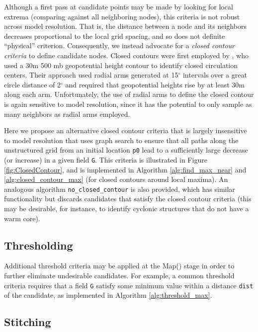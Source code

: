 \documentclass[gmdd, hvmath, online]{copernicus_discussions}
\begin{document}
Although a first pass at candidate points may be made by looking for local extrema (comparing against all neighboring nodes), this criteria is not robust across model resolution.  That is, the distance between a node and its neighbors decreases proportional to the local grid spacing, and so does not definite ``physical'' criterion.  Consequently, we instead advocate for a \textit{closed contour criteria} to define candidate nodes.  Closed contours were first employed by \cite{bell198915}, who used a 30m 500 mb geopotential height contour to identify closed circulation centers.  Their approach used radial arms generated at 15$^\circ$ intervals over a great circle distance of 2$^\circ$ and required that geopotential heights rise by at least 30m along each arm.  Unfortunately, the use of radial arms to define the closed contour is again sensitive to model resolution, since it has the potential to only sample as many neighbors as radial arms employed.

Here we propose an alternative closed contour criteria that is largely insensitive to model resolution that uses graph search to ensure that all paths along the unstructured grid from an initial location \texttt{p0} lead to a sufficiently large decrease (or increase) in a given field \texttt{G}.  This criteria is illustrated in Figure \ref{fig:ClosedContour}, and is implemented in Algorithm \ref{alg:find_max_near} and \ref{alg:closed_contour_max} (for closed contours around local maxima).  An analogous algorithm \texttt{no\_closed\_contour} is also provided, which has similar functionality but discards candidates that satisfy the closed contour criteria (this may be desirable, for instance, to identify cyclonic structures that do not have a warm core).

\subsection{Thresholding}

Additional threshold criteria may be applied at the Map() stage in order to further eliminate undesirable candidates.  For example, a common threshold criteria requires that a field \texttt{G} satisfy some minimum value within a distance \texttt{dist} of the candidate, as implemented in Algorithm \ref{alg:threshold_max}.

\subsection{Stitching}
\end{document}
